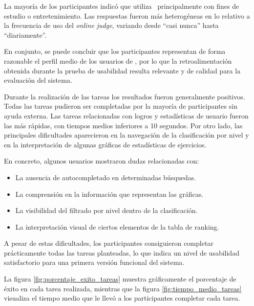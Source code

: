 La mayoría de los participantes indicó que utiliza \aer\ principalmente con fines de estudio o entretenimiento. Las respuestas fueron más heterogéneas en lo relativo a la frecuencia de uso del \textit{online judge}, variando desde ``casi nunca'' hasta ``diariamente''.

En conjunto, se puede concluir que los participantes representan de forma razonable el perfil medio de los usuarios de \aer, por lo que la retroalimentación obtenida durante la prueba de usabilidad resulta relevante y de calidad para la evaluación del sistema.

Durante la realización de las tareas los resultados fueron generalmente positivos. Todas las tareas pudieron ser completadas por la mayoría de participantes sin ayuda externa. Las tareas relacionadas con logros y estadísticas de usuario fueron las más rápidas, con tiempos medios inferiores a 10 segundos. Por otro lado, las principales dificultades aparecieron en la navegación de la clasificación por nivel y en la interpretación de algunas gráficas de estadísticas de ejercicios.

En concreto, algunos usuarios mostraron dudas relacionadas con:

\begin{itemize}
    \item La ausencia de autocompletado en determinadas búsquedas.
    \item La comprensión en la información que representan las gráficas.
    \item La visibilidad del filtrado por nivel dentro de la clasificación.
    \item La interpretación visual de ciertos elementos de la tabla de ranking.
\end{itemize}

A pesar de estas dificultades, los participantes consiguieron completar prácticamente todas las tareas planteadas, lo que indica un nivel de usabilidad satisfactorio para una primera versión funcional del sistema.

La figura \ref{fig:porcentaje_exito_tareas} muestra gráficamente el porcentaje de éxito en cada tarea realizada, mientras que la figura \ref{fig:tiempo_medio_tareas} visualiza el tiempo medio que le llevó a los participantes completar cada tarea. 

